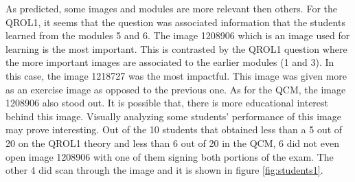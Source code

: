 \documentclass[a4paper,11pt]{report}
\numberwithin{figure}{chapter} %
\begin{document}
    As predicted, some images and modules are more relevant then others.
    For the QROL1, it seems that the question was associated information that the students learned from the modules 5 and 6.
    The image 1208906 which is an image used for learning is the most important.
    This is contrasted by the QROL1 question where the more important images are associated to the earlier modules (1 and 3).
    In this case, the image 1218727 was the most impactful.
    This image was given more as an exercise image as opposed to the previous one.
    As for the QCM, the image 1208906 also stood out.
    It is possible that, there is more educational interest behind this image.
    Visually analyzing some students' performance of this image may prove interesting.
    Out of the 10 students that obtained less than a 5 out of 20 on the QROL1 theory and less than 6 out of 20 in the QCM, 6 did not even open image 1208906 with one of them signing both portions of the exam.
    The other 4 did scan through the image and it is shown in figure \ref{fig:students1}.
\end{document}
